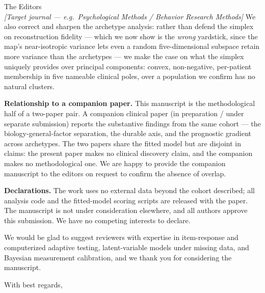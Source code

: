 \documentclass[11pt]{letter}
\begin{document}
\begin{letter}{The Editors\\ \textit{[Target journal --- e.g.\ Psychological Methods / Behavior Research Methods]}}
We also correct and sharpen the archetype analysis: rather than defend the simplex on
reconstruction fidelity --- which we now show is the \emph{wrong} yardstick, since the map's
near-isotropic variance lets even a random five-dimensional subspace retain more variance than
the archetypes --- we make the case on what the simplex uniquely provides over principal
components: convex, non-negative, per-patient membership in five nameable clinical poles, over a
population we confirm has no natural clusters.

\textbf{Relationship to a companion paper.} This manuscript is the methodological half of a
two-paper pair. A companion clinical paper (in preparation / under separate submission) reports
the substantive findings from the same cohort --- the biology-general-factor separation, the
durable axis, and the prognostic gradient across archetypes. The two papers share the fitted
model but are disjoint in claims: the present paper makes no clinical discovery claim, and the
companion makes no methodological one. We are happy to provide the companion manuscript to the
editors on request to confirm the absence of overlap.

\textbf{Declarations.} The work uses no external data beyond the cohort described; all analysis
code and the fitted-model scoring scripts are released with the paper. The manuscript is not
under consideration elsewhere, and all authors approve this submission. We have no competing
interests to declare.

We would be glad to suggest reviewers with expertise in item-response and computerized adaptive
testing, latent-variable models under missing data, and Bayesian measurement calibration, and we
thank you for considering the manuscript.

\closing{With best regards,}

\end{letter}
\end{document}

